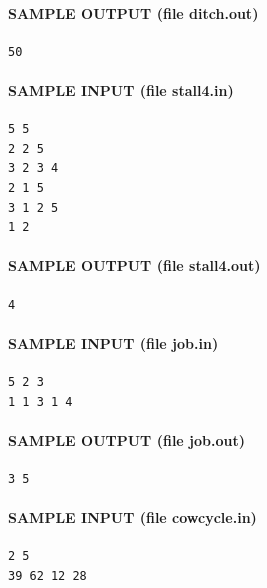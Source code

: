 \documentclass[11pt]{article}
\begin{document}
\paragraph{SAMPLE OUTPUT (file ditch.out)}
\begin{verbatim}
50
\end{verbatim}

\paragraph{SAMPLE INPUT (file stall4.in)}
\begin{verbatim}
5 5
2 2 5
3 2 3 4
2 1 5
3 1 2 5
1 2
\end{verbatim}

\paragraph{SAMPLE OUTPUT (file stall4.out)}
\begin{verbatim}
4
\end{verbatim}

\paragraph{SAMPLE INPUT (file job.in)}
\begin{verbatim}
5 2 3
1 1 3 1 4
\end{verbatim}

\paragraph{SAMPLE OUTPUT (file job.out)}
\begin{verbatim}
3 5
\end{verbatim}

\paragraph{SAMPLE INPUT (file cowcycle.in)}
\begin{verbatim}
2 5
39 62 12 28
\end{verbatim}
\end{document}
